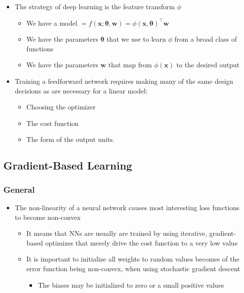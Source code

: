\documentclass[11pt]{article}
\begin{document}
\begin{itemize}
\item The strategy of deep learning is the feature transform \(\phi\)
\begin{itemize}
\item We have a model \(=f(\pmb x; \pmb \theta, \pmb w) = \phi(\pmb x, \pmb \theta)^\top \pmb w\)
\item We have the parameters \(\pmb \theta\) that we use to learn \(\phi\) from a broad class of functions
\item We have the parameters \(\pmb w\) that map from \(\phi(\pmb x)\) to the desired output
\end{itemize}

\item Training a feedforward network requires making many of the same design decisions as are necessary for a linear model:
\begin{itemize}
\item Choosing the optimizer
\item The cost function
\item The form of the output units.
\end{itemize}
\end{itemize}

\subsection{Gradient-Based Learning}
\label{sec:org8264ab3}
\subsubsection{General}
\label{sec:orgb16f43e}
\begin{itemize}
\item The non-linearity of a neural network causes most interesting loss functions to become non-convex
\begin{itemize}
\item It means that NNs are usually are trained by using iterative, gradient-based optimizes that merely drive the cost function to a very low value
\item It is important to initialize all weights to random values becomes of the error function being non-convex, when using stochastic gradient descent 
\begin{itemize}
\item The biases may be initialized to zero or a small positive values
\end{itemize}
\end{itemize}
\end{itemize}
\end{document}
